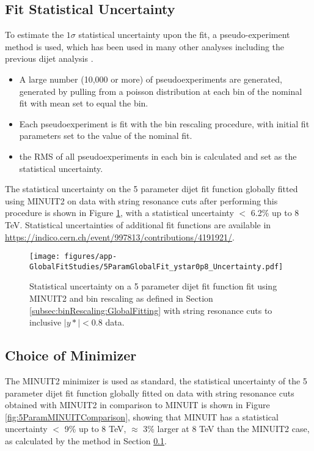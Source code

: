 \subsection{Fit Statistical Uncertainty}
\label{subsec:fitStatUnc:GlobalFitting} %

To estimate the $1\sigma$ statistical uncertainty upon the fit, a pseudo-experiment method is used, which has been used in many other analyses including the previous dijet analysis \cite{ATL-COM-PHYS-2018-1538}.

\begin{itemize}
    \item A large number (10,000 or more) of pseudoexperiments are generated, generated by pulling from a poisson distribution at each bin of the nominal fit with mean set to equal the bin.
    \item Each pseudoexperiment is fit with the bin rescaling procedure, with initial fit parameters set to the value of the nominal fit.
    \item the RMS of all pseudoexperiments in each bin is calculated and set as the statistical uncertainty.
\end{itemize}

The statistical uncertainty on the 5 parameter dijet fit function globally fitted using MINUIT2 on data with string resonance cuts after performing this procedure is shown in Figure \ref{fig:5ParamStatisticalUncertainty}, with a statistical uncertainty $ < $ 6.2\% up to 8 TeV. Statistical uncertainties of additional fit functions are available in \\ {\href{https://indico.cern.ch/event/997813/contributions/4191921/attachments/2178521/3679266/dijet_CompareBinRescale_26_01_2021.pdf}{https://indico.cern.ch/event/997813/contributions/4191921/}}.

\begin{figure}
    \centering
    \texttt{[image: figures/app-GlobalFitStudies/5ParamGlobalFit\_ystar0p8\_Uncertainty.pdf]}
    \caption{Statistical uncertainty on a 5 parameter dijet fit function fit using MINUIT2 and bin rescaling as defined in Section \ref{subsec:binRescaling:GlobalFitting}  with string resonance cuts to inclusive $|y*|<0.8$ data.}
    \label{fig:5ParamStatisticalUncertainty}
\end{figure}

\subsection{Choice of Minimizer}
The MINUIT2 minimizer is used as standard, the statistical uncertainty of the 5 parameter dijet fit function globally fitted on data with string resonance cuts obtained with MINUIT2 in comparison to MINUIT is shown in Figure \ref{fig:5ParamMINUITComparison}, showing that MINUIT has a statistical uncertainty $ < $ 9\% up to 8 TeV, $\approx$ 3\% larger at 8 TeV than the MINUIT2 case, as calculated by the method in Section \ref{subsec:fitStatUnc:GlobalFitting}.

